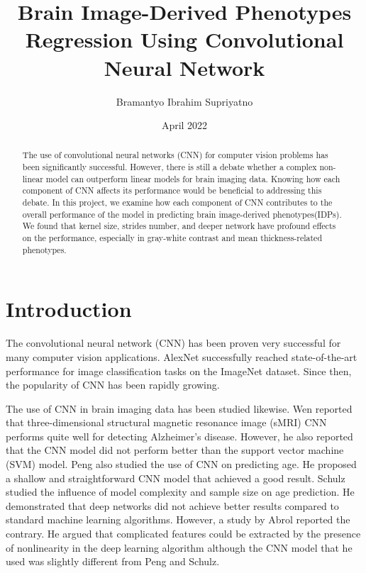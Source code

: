 \documentclass{article}
\title{Brain Image-Derived Phenotypes Regression Using Convolutional Neural Network}
\author{Bramantyo Ibrahim Supriyatno}
\date{April 2022}
\begin{document}
    \maketitle
    \begin{abstract}
        The use of convolutional neural networks (CNN) for computer vision problems has been significantly successful. 
        However, there is still a debate whether a complex non-linear model can outperform linear models for brain imaging data. 
        Knowing how each component of CNN affects its performance would be beneficial to addressing this debate. 
        In this project, we examine how each component of CNN contributes to the overall performance of the model in predicting brain image-derived phenotypes(IDPs). 
        We found that kernel size, strides number, and deeper network have profound effects on the performance, especially in gray-white contrast and mean thickness-related phenotypes.
    \end{abstract}
    
    \section*{Introduction}
    The convolutional neural network (CNN) has been proven very successful for many computer vision applications. 
    AlexNet\cite{alexnet} successfully reached state-of-the-art performance for image classification tasks on the ImageNet dataset. 
    Since then, the popularity of CNN has been rapidly growing.
    
    The use of CNN in brain imaging data has been studied likewise. 
    Wen\cite{wen} reported that three-dimensional structural magnetic resonance image (sMRI) CNN performs quite well for detecting Alzheimer's disease. 
    However, he also reported that the CNN model did not perform better than the support vector machine (SVM) model. 
    Peng\cite{peng} also studied the use of CNN on predicting age. He proposed a shallow and straightforward CNN model that achieved a good result. 
    Schulz\cite{schulz} studied the influence of model complexity and sample size on age prediction. 
    He demonstrated that deep networks did not achieve better results compared to standard machine learning algorithms. 
    However, a study by Abrol\cite{abrol} reported the contrary. 
    He argued that complicated features could be extracted by the presence of nonlinearity in the deep learning algorithm  
    although the CNN model that he used was slightly different from Peng and Schulz. 
        
\end{document}
